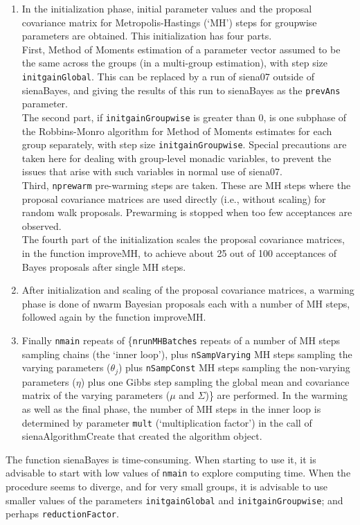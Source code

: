 \documentclass[a4paper,fleqn,11pt]{article}
\newcommand{\+}{\, + \,}
\newcommand{\sfn}[1]{\textsf{#1}}
\begin{document}
  \begin{enumerate}
  \item
  In the initialization phase, initial parameter values and the proposal
  covariance matrix for Metropolis-Hastings (`MH') steps for groupwise parameters
  are obtained.
  This initialization has four parts.\\
  First, Method of Moments estimation of a parameter vector
  assumed to be the same across the groups (in a multi-group estimation),
  with step size \texttt{initgainGlobal}.
  This can be replaced by a run of \textsf{siena07} outside of \textsf{sienaBayes},
  and giving the results of this run to \textsf{sienaBayes}
  as the \texttt{prevAns} parameter.\\
  The second part, if \texttt{initgainGroupwise} is greater than 0,
  is one subphase of the Robbins-Monro algorithm for Method of
  Moments estimates for each group separately, with step size
  \texttt{initgainGroupwise}.
  Special precautions are taken here for dealing with group-level monadic variables,
  to prevent the issues that arise with such variables in normal use of \textsf{siena07}.\\
  Third, \texttt{nprewarm} pre-warming steps are taken. These are MH steps where the
  proposal covariance matrices are used directly (i.e., without scaling)
  for random walk proposals. Prewarming is stopped when too few
  acceptances are observed.\\
  The fourth part of the initialization scales
  the proposal covariance matrices, in the
  function \sfn{improveMH}, to achieve about 25 out of 100 acceptances of
  Bayes proposals after single MH steps.
  \item
  After initialization and scaling of the proposal covariance matrices,
  a warming phase is done of \sfn{nwarm} Bayesian proposals
  each with a number of MH steps, followed again by the function \sfn{improveMH}.
  \item
  Finally \texttt{nmain} repeats of \Big\{\texttt{nrunMHBatches} repeats of a
  number of MH steps sampling chains (the `inner loop'),
  plus \texttt{nSampVarying} MH steps
  sampling the varying parameters ($\theta_j$) plus \texttt{nSampConst} MH steps
  sampling the non-varying parameters ($\eta$) plus one Gibbs
  step sampling the global mean and covariance matrix of the varying parameters
  ($\mu$ and $\Sigma$)\Big\} are performed.
  In the warming as well as the final phase,
  the number of MH steps in the inner loop is
  determined by parameter \texttt{mult} (`multiplication factor')
  in the call of \textsf{sienaAlgorithmCreate} that created the algorithm object.
\end{enumerate}
  The function \textsf{sienaBayes} is time-consuming. When starting to use it, it is advisable
  to start with low values of \texttt{nmain} to explore computing time.
  When the procedure seems to diverge, and for very small groups, it is
  advisable to use smaller values of the parameters \texttt{initgainGlobal}
  and \texttt{initgainGroupwise}; and perhaps \texttt{reductionFactor}.
\end{document}
